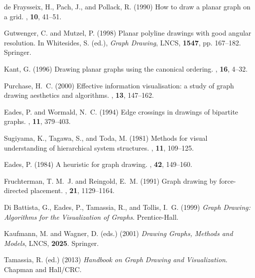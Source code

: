 \documentclass{comjnl}
\begin{document}

\begin{thebibliography}{99}

de Fraysseix, H., Pach, J., and Pollack, R. (1990) How to draw a planar graph
  on a grid.
, {\bf  10}, 41--51.

Gutwenger, C. and Mutzel, P. (1998) Planar polyline drawings with good angular
  resolution.
\newblock In Whitesides, S. (ed.), {\em {Graph Drawing}},  LNCS, {\bf1547},
  pp. 167--182. Springer.

Kant, G. (1996) Drawing planar graphs using the canonical ordering.
, {\bf  16}, 4--32.

Purchase, H.~C. (2000) Effective information visualisation: a study of graph
  drawing aesthetics and algorithms.
, {\bf  13}, 147--162.

Eades, P. and Wormald, N.~C. (1994) Edge crossings in drawings of bipartite
  graphs.
, {\bf  11}, 379--403.

Sugiyama, K., Tagawa, S., and Toda, M. (1981) Methods for visual understanding
  of hierarchical system structures.
, {\bf  11},
  109--125.

Eades, P. (1984) A heuristic for graph drawing.
, {\bf  42}, 149--160.

Fruchterman, T. M.~J. and Reingold, E.~M. (1991) Graph drawing by
  force-directed placement.
, {\bf  21}, 1129--1164.

{Di Battista}, G., Eades, P., Tamassia, R., and Tollis, I.~G. (1999) {\em Graph
  Drawing: Algorithms for the Visualization of Graphs}. Prentice-Hall.

Kaufmann, M. and Wagner, D. (eds.) (2001) {\em Drawing Graphs, Methods and
  Models},  LNCS, {\bf2025}. Springer.

Tamassia, R. (ed.) (2013) {\em Handbook on Graph Drawing and Visualization}.
  Chapman and Hall/CRC.


\end{thebibliography}
\end{document}
